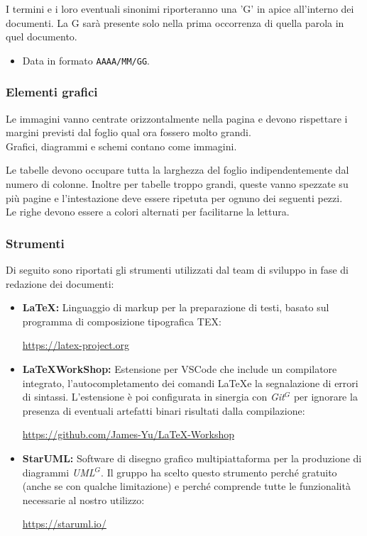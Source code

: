     I termini e i loro eventuali sinonimi riporteranno una 'G' in apice all'interno dei documenti. La G sarà
    presente solo nella prima occorrenza di quella parola in quel documento.

    \begin{itemize}
    \item Data in formato \texttt{AAAA/MM/GG}. %
    \end{itemize}

\subsubsection{Elementi grafici}

    Le immagini vanno centrate orizzontalmente nella pagina e devono rispettare i margini previsti dal foglio qual ora
    fossero molto grandi.\\
    Grafici, diagrammi e schemi contano come immagini.

    Le tabelle devono occupare tutta la larghezza del foglio indipendentemente dal numero di colonne.
    Inoltre per tabelle troppo grandi, queste vanno spezzate su più pagine e l'intestazione deve essere ripetuta
    per ognuno dei seguenti pezzi.\\
    Le righe devono essere a colori alternati per facilitarne la lettura.
\pagebreak
\subsubsection{Strumenti}

Di seguito sono riportati gli strumenti utilizzati dal team di sviluppo in fase di redazione dei documenti:

\begin{itemize}
  \item \textbf{\LaTeX:} Linguaggio di markup per la preparazione di testi, basato sul programma di composizione tipografica TEX:
    \begin{center}
      \url{https://latex-project.org}
    \end{center}
  \item \textbf{\LaTeX WorkShop:} Estensione per VSCode che include un compilatore integrato, l'autocompletamento dei comandi \LaTeX e la segnalazione di errori di sintassi. L'estensione è poi configurata in sinergia con \emph{Git}$^{G}$ per ignorare la presenza di eventuali artefatti binari risultati dalla compilazione:
  \begin{center}
    \url{https://github.com/James-Yu/LaTeX-Workshop}
  \end{center}
  \item \textbf{StarUML:} Software di disegno grafico multipiattaforma per la produzione di diagrammi \emph{UML}$^{G}$. Il gruppo ha scelto questo strumento perché gratuito (anche se con qualche limitazione) e perché comprende tutte le funzionalità necessarie al nostro utilizzo:
  \begin{center}
    \url{https://staruml.io/}
  \end{center}
\end{itemize}


